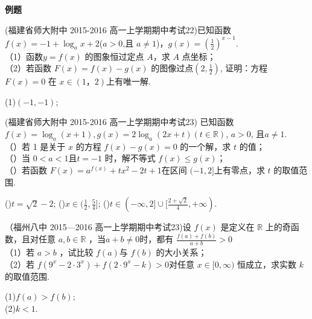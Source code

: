 \begin{exercise}{\large \bf 例\hspace{0.6em}题}
\item (福建省师大附中 2015-2016 高一上学期期中考试22)已知函数$f(x)=-1+\log_a{x+2}$($a>0$,且 $a \neq1$)，$g(x)=(\frac12)^{x-1}$.\\
（1）函数$ y= f (x )$ 的图象恒过定点 $A$，求 $A$ 点坐标；\\
（2）若函数 $F ( x )= f ( x )- g ( x )$ 的图像过点$(2,\frac12)$, 证明：方程 $F ( x )= 0$ 在 $x\in(1，2)$上有唯一解.
\begin{answer}
(1)$(-1,-1)$;\\
\end{answer}
\vspace{20em}


\item (福建省师大附中 2015-2016 高一上学期期中考试23) 已知函数 $f ( x ) =\log_a ( x+ 1), g ( x )= 2 \log_a ( 2 x+ t )(t\in \mathbb{R})$, $a> 0$, 且$a\neq 1$.\\
（）若 1 是关于 $x$ 的方程 $f ( x) -g ( x) =0$ 的一个解，求 $t$ 的值；\\
（）当 $0< a< 1$且$t=-1$ 时，解不等式 $f ( x)\leq g ( x) $；\\
（）若函数 $F ( x)= a^{f ( x ) }+ tx^2- 2t+ 1 $在区间 $(-1,2]$上有零点，求 $t$ 的取值范围.
\begin{answer}
()$t=\sqrt{2}-2$;
()$x\in(\frac12,\frac54]$;
()$t\in(-\infty,2]\cup [\frac{2+\sqrt{2}}{4},+\infty)$.
\end{answer}
\vspace{21em}

\item
（福州八中 2015—2016 高一上学期期中考试23)设 $f (x )$ 是定义在 $\mathbb{R}$ 上的奇函数，且对任意 $a,b\in \mathbb{R}$ ，当$a+b\neq0$时，都有 $\frac{f(a)+f(b)}{a+b}>0$\\
（1）若 $a> b$ ，试比较 $f (a ) $与 $f (b)$ 的大小关系；\\
（2）若 $f (9^x- 2\cdot 3^x )+ f ( 2\cdot 9^x-k )> 0 $对任意 $x\in[0,\infty )$ 恒成立，求实数 $k$ 的取值范围.
\begin{answer}
(1)$f(a)>f(b)$;\\
(2)$k<1$.\\
\end{answer}
\vspace{22em}


\end{exercise}
